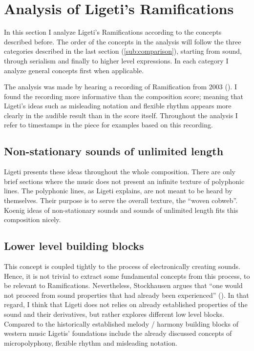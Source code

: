 \documentclass[a4paper,11pt]{article}
\begin{document}
\section{Analysis of Ligeti's Ramifications}
\label{sub:ramifications}

In this section I analyze Ligeti's Ramifications according to the concepts described before.
The order of the concepts in the analysis will follow the three categories described in the last section (\ref{sub:comparison}), starting from sound, through serialism and finally to higher level expressions.
In each category I analyze general concepts first when applicable.

The analysis was made by hearing a recording of Ramification from 2003 (\cite{rami_music}).
I found the recording more informative than the composition score;
meaning that Ligeti's ideas such as misleading notation and flexible rhythm appears more clearly in the audible result than in the score itself.
Throughout the analysis I refer to timestamps in the piece for examples based on this recording.

\subsection*{Non-stationary sounds of unlimited length}

Ligeti presents these ideas throughout the whole composition.
There are only brief sections where the music does not present an infinite texture of polyphonic lines.
The polyphonic lines, as Ligeti explains, are not meant to be heard by themselves.
Their purpose is to serve the overall texture, the ``woven cobweb''.
Koenig ideas of non-stationary sounds and sounds of unlimited length fits this composition nicely.

\subsection*{Lower level building blocks}

This concept is coupled tightly to the process of electronically creating sounds.
Hence, it is not trivial to extract some fundamental concepts from this process, to be relevant to Ramifications.
Nevertheless, Stockhausen argues that ``one would not proceed from sound properties that had already been experienced'' (\cite[p. 42]{stockhausen}).
In that regard, I think that Ligeti does not relies on already established properties of the sound and their derivatives, but rather explores different low level blocks.
Compared to the historically established melody / harmony building blocks of western music Ligetis' foundations include the already discussed concepts of micropolyphony, flexible rhythm and misleading notation.
\end{document}
